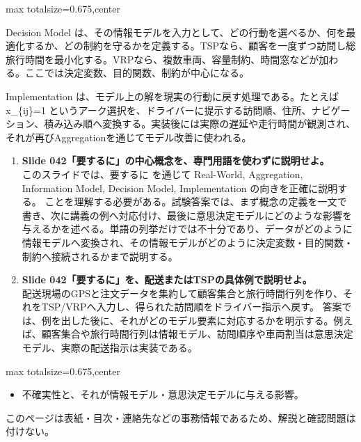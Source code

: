 \begin{adjustbox}{max totalsize={\textwidth}{0.675\textheight},center}
\begin{minipage}{\textwidth}
\begin{minipage}[t]{0.485\textwidth}
Decision Model は、その情報モデルを入力として、どの行動を選べるか、何を最適化するか、どの制約を守るかを定義する。TSPなら、顧客を一度ずつ訪問し総旅行時間を最小化する。VRPなら、複数車両、容量制約、時間窓などが加わる。ここでは決定変数、目的関数、制約が中心になる。\par
Implementation は、モデル上の解を現実の行動に戻す処理である。たとえば x\_\{ij\}=1 というアーク選択を、ドライバーに提示する訪問順、住所、ナビゲーション、積み込み順へ変換する。実装後には実際の遅延や走行時間が観測され、それが再びAggregationを通じてモデル改善に使われる。\par
{}
\begin{enumerate}
\item \textbf{Slide 042「要するに」の中心概念を、専門用語を使わずに説明せよ。}\\このスライドでは、要するに を通じて Real-World, Aggregation, Information Model, Decision Model, Implementation の向きを正確に説明する。 ことを理解する必要がある。試験答案では、まず概念の定義を一文で書き、次に講義の例へ対応付け、最後に意思決定モデルにどのような影響を与えるかを述べる。単語の列挙だけでは不十分であり、データがどのように情報モデルへ変換され、その情報モデルがどのように決定変数・目的関数・制約へ接続されるかまで説明する。
\item \textbf{Slide 042「要するに」を、配送またはTSPの具体例で説明せよ。}\\配送現場のGPSと注文データを集約して顧客集合と旅行時間行列を作り、それをTSP/VRPへ入力し、得られた訪問順をドライバー指示へ戻す。 答案では、例を出した後に、それがどのモデル要素に対応するかを明示する。例えば、顧客集合や旅行時間行列は情報モデル、訪問順序や車両割当は意思決定モデル、実際の配送指示は実装である。
\end{enumerate}
\end{minipage}
\end{minipage}
\end{adjustbox}

\clearpage
{}
\begin{adjustbox}{max totalsize={\textwidth}{0.675\textheight},center}
\begin{minipage}{\textwidth}\scriptsize
\begin{minipage}[t]{0.485\textwidth}
\begin{itemize}
\item 不確実性と、それが情報モデル・意思決定モデルに与える影響。
\end{itemize}
\end{minipage}\hfill
\begin{minipage}[t]{0.485\textwidth}
{\small このページは表紙・目次・連絡先などの事務情報であるため、解説と確認問題は付けない。}
\end{minipage}
\end{minipage}
\end{adjustbox}
